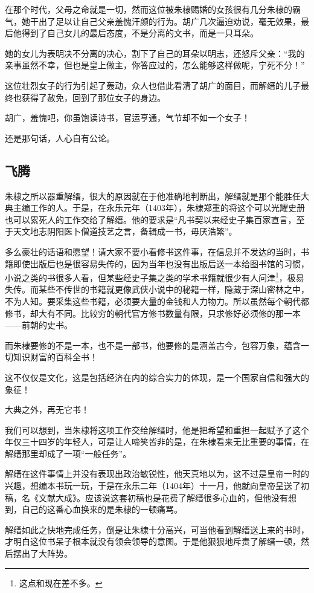 \begin{multicols}{\theparacolNo}
在那个时代，父母之命就是一切，然而这位被朱棣赐婚的女孩很有几分朱棣的霸气，她干出了足以让自己父亲羞愧汗颜的行为。胡广几次逼迫劝说，毫无效果，最后他得到了自己女儿的最后态度，不是分离的文书，而是一只耳朵。

她的女儿为表明决不分离的决心，割下了自己的耳朵以明志，还怒斥父亲：“我的亲事虽然不幸，但也是皇上做主，你答应过的，怎么能够这样做呢，宁死不分！”

这位壮烈女子的行为引起了轰动，众人也借此看清了胡广的面目，而解缙的儿子最终也获得了赦免，回到了那位女子的身边。

胡广，羞愧吧，你虽饱读诗书，官运亨通，气节却不如一个女子！

还是那句话，人心自有公论。

\subsection{飞腾}
朱棣之所以器重解缙，很大的原因就在于他准确地判断出，解缙就是那个能胜任大典主编工作的人。于是，在永乐元年（1403年），朱棣郑重的将这个可以光耀史册也可以累死人的工作交给了解缙。他的要求是“凡书契以来经史子集百家直言，至于天文地志阴阳医卜僧道技艺之言，备辑成一书，毋厌浩繁”。

多么豪壮的话语和愿望！请大家不要小看修书这件事，在信息并不发达的当时，书籍即使出版后也是很容易失传的，因为当年也没有出版后送一本给图书馆的习惯，小说之类的书很多人看，但某些经史子集之类的学术书籍就很少有人问津\footnote{这点和现在差不多。}，极易失传。而某些不传世的书籍就更像武侠小说中的秘籍一样，隐藏于深山密林之中，不为人知。要采集这些书籍，必须要大量的金钱和人力物力。所以虽然每个朝代都修书，却大有不同。比较穷的朝代官方修书数量有限，只求修好必须修的那一本——前朝的史书。

而朱棣要修的不是一本，也不是一部书，他要修的是涵盖古今，包容万象，蕴含一切知识财富的百科全书！

这不仅仅是文化，这是包括经济在内的综合实力的体现，是一个国家自信和强大的象征！

大典之外，再无它书！

我们可以想到，当朱棣将这项工作交给解缙时，他是把希望和重担一起赋予了这个年仅三十四岁的年轻人，可是让人啼笑皆非的是，在朱棣看来无比重要的事情，在解缙那里却成了一项“一般任务”。

解缙在这件事情上并没有表现出政治敏锐性，他天真地以为，这不过是皇帝一时的兴趣，想编本书玩一玩，于是在永乐二年（1404年）十一月，他就向皇帝呈送了初稿，名《文献大成》。应该说这套初稿也是花费了解缙很多心血的，但他没有想到，自己的这番心血换来的是朱棣的一顿痛骂。

解缙如此之快地完成任务，倒是让朱棣十分高兴，可当他看到解缙送上来的书时，才明白这位书呆子根本就没有领会领导的意图。于是他狠狠地斥责了解缙一顿，然后摆出了大阵势。


\end{multicols}
